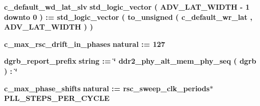 \begin{DoxyCompactItemize}
\item 
{\bf c\+\_\+default\+\_\+wd\+\_\+lat\+\_\+slv} {\bfseries \textcolor{comment}{std\+\_\+logic\+\_\+vector}\textcolor{vhdlchar}{ }\textcolor{vhdlchar}{(}\textcolor{vhdlchar}{ }\textcolor{vhdlchar}{ }\textcolor{vhdlchar}{ }\textcolor{vhdlchar}{ }{\bfseries {\bf A\+D\+V\+\_\+\+L\+A\+T\+\_\+\+W\+I\+D\+TH}} \textcolor{vhdlchar}{-\/}\textcolor{vhdlchar}{ } \textcolor{vhdldigit}{1} \textcolor{vhdlchar}{ }\textcolor{keywordflow}{downto}\textcolor{vhdlchar}{ }\textcolor{vhdlchar}{ } \textcolor{vhdldigit}{0} \textcolor{vhdlchar}{ }\textcolor{vhdlchar}{)}\textcolor{vhdlchar}{ }\textcolor{vhdlchar}{ }\textcolor{vhdlchar}{ }\textcolor{vhdlchar}{\+:}\textcolor{vhdlchar}{=}\textcolor{vhdlchar}{ }\textcolor{vhdlchar}{ }\textcolor{vhdlchar}{ }\textcolor{vhdlchar}{ }\textcolor{comment}{std\+\_\+logic\+\_\+vector}\textcolor{vhdlchar}{ }\textcolor{vhdlchar}{(}\textcolor{vhdlchar}{ }\textcolor{vhdlchar}{to\+\_\+unsigned}\textcolor{vhdlchar}{ }\textcolor{vhdlchar}{(}\textcolor{vhdlchar}{ }\textcolor{vhdlchar}{ }\textcolor{vhdlchar}{ }\textcolor{vhdlchar}{ }{\bfseries {\bf c\+\_\+default\+\_\+wr\+\_\+lat}} \textcolor{vhdlchar}{ }\textcolor{vhdlchar}{,}\textcolor{vhdlchar}{ }\textcolor{vhdlchar}{ }\textcolor{vhdlchar}{ }\textcolor{vhdlchar}{ }{\bfseries {\bf A\+D\+V\+\_\+\+L\+A\+T\+\_\+\+W\+I\+D\+TH}} \textcolor{vhdlchar}{ }\textcolor{vhdlchar}{)}\textcolor{vhdlchar}{ }\textcolor{vhdlchar}{ }\textcolor{vhdlchar}{ }\textcolor{vhdlchar}{)}\textcolor{vhdlchar}{ }} 
\item 
{\bf c\+\_\+max\+\_\+rsc\+\_\+drift\+\_\+in\+\_\+phases} {\bfseries \textcolor{comment}{natural}\textcolor{vhdlchar}{ }\textcolor{vhdlchar}{ }\textcolor{vhdlchar}{\+:}\textcolor{vhdlchar}{=}\textcolor{vhdlchar}{ }\textcolor{vhdlchar}{ } \textcolor{vhdldigit}{127} \textcolor{vhdlchar}{ }} 
\item 
{\bf dgrb\+\_\+report\+\_\+prefix} {\bfseries \textcolor{comment}{string}\textcolor{vhdlchar}{ }\textcolor{vhdlchar}{ }\textcolor{vhdlchar}{\+:}\textcolor{vhdlchar}{=}\textcolor{vhdlchar}{ }\textcolor{vhdlchar}{ }\textcolor{vhdlchar}{ }\textcolor{vhdlchar}{ }\textcolor{keyword}{\char`\"{} ddr2\+\_\+phy\+\_\+alt\+\_\+mem\+\_\+phy\+\_\+seq ( dgrb )  \+:  \char`\"{}}\textcolor{vhdlchar}{ }} 
\item 
{\bf c\+\_\+max\+\_\+phase\+\_\+shifts} {\bfseries \textcolor{comment}{natural}\textcolor{vhdlchar}{ }\textcolor{vhdlchar}{ }\textcolor{vhdlchar}{\+:}\textcolor{vhdlchar}{=}\textcolor{vhdlchar}{ }\textcolor{vhdlchar}{ }\textcolor{vhdlchar}{ }\textcolor{vhdlchar}{ }\textcolor{vhdlchar}{rsc\+\_\+sweep\+\_\+clk\+\_\+periods}\textcolor{vhdlchar}{$\ast$}\textcolor{vhdlchar}{ }\textcolor{vhdlchar}{ }\textcolor{vhdlchar}{ }{\bfseries {\bf P\+L\+L\+\_\+\+S\+T\+E\+P\+S\+\_\+\+P\+E\+R\+\_\+\+C\+Y\+C\+LE}} \textcolor{vhdlchar}{ }} 

\end{DoxyCompactItemize}
